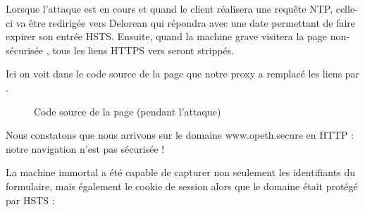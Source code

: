 Lorsque l'attaque est en cours et quand le client réalisera une requête NTP, celle-ci va être redirigée vers Delorean qui répondra avec une date permettant de faire expirer son entrée HSTS. Ensuite, quand la machine grave visitera la page non-sécurisée , tous les liens HTTPS vers  seront strippés.

Ici on voit dans le code source de la page que notre proxy a remplacé les liens  par .

\begin{figure}[H]
  \caption{Code source de la page (pendant l'attaque)}
\end{figure}

Nous constatons que nous arrivons sur le domaine www.opeth.secure en HTTP : notre navigation n'est pas sécurisée !

\begin{figure}[H]
\end{figure}

La machine immortal a été capable de capturer non seulement les identifiants du formulaire, mais également le cookie de session alors que le domaine était protégé par HSTS :

\begin{figure}[H]
\end{figure}

